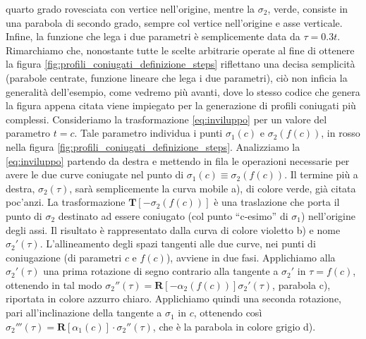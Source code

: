 quarto grado rovesciata con vertice nell'origine, mentre la $\sigma_2$, verde,
consiste in una parabola di secondo grado, sempre col vertice nell'origine
e asse verticale.
Infine, la funzione che lega i due parametri \`e semplicemente data
da $\tau=0.3t$. Rimarchiamo che, nonostante tutte le scelte arbitrarie
operate al fine di ottenere la figura
\ref{fig:profili_coniugati_definizione_steps} riflettano una decisa semplicit\`a
(parabole centrate, funzione lineare che lega i due parametri), ci\`o non
inficia la generalit\`a dell'esempio, come vedremo pi\`u avanti, dove lo stesso
codice che genera la figura appena citata viene impiegato per
la generazione di profili coniugati pi\`u complessi. 
Consideriamo la trasformazione \ref{eq:inviluppo} per un valore del parametro
$t=c$.  Tale parametro individua i punti $\sigma_1(c)$ e $\sigma_2(f(c))$,
in rosso nella figura \ref{fig:profili_coniugati_definizione_steps}.
Analizziamo la \ref{eq:inviluppo} partendo da
destra e mettendo in fila le operazioni necessarie per avere le due
curve coniugate nel punto di $\sigma_1(c)\equiv\sigma_2(f(c))$.
Il termine pi\`u a destra, $\sigma_2(\tau)$,
sar\`a semplicemente la curva mobile a), di colore verde, gi\`a citata poc'anzi.
La trasformazione $ {\bm T} [-\sigma_2(f(c))] $ \`e una traslazione che porta il 
punto di $\sigma_2$ destinato ad essere coniugato (col punto ``c-esimo'' di
$\sigma_1$) nell'origine degli assi. Il risultato \`e rappresentato dalla 
curva di colore violetto b) e nome $\sigma_2'(\tau)$.
L'allineamento degli spazi tangenti alle due curve, nei
punti di coniugazione (di parametri $c$ e $f(c)$), avviene in due fasi.
Applichiamo alla $\sigma_2'(\tau)$ una prima rotazione 
di segno contrario alla tangente a $\sigma_2'$ in $\tau=f(c)$, ottenendo in tal
modo $\sigma_2''(\tau)={\bm R}[-\alpha_2(f(c))]\sigma_2'(\tau)$,
parabola c), riportata in colore azzurro chiaro. Applichiamo quindi una seconda
rotazione, pari all'inclinazione della tangente a $\sigma_1$ in $c$, ottenendo
cos\`i $\sigma_2'''(\tau)={\bm R}[\alpha_1(c)]\cdot\sigma_2''(\tau)$,
che \`e la parabola in colore grigio d).
